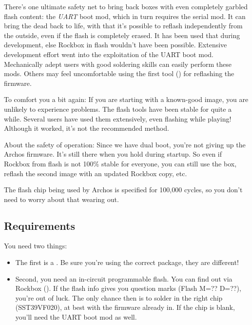
There's one ultimate safety net to bring back boxes with even completely 
garbled flash content: the \emph{UART} boot mod, which in turn requires the 
serial mod. It can bring the dead back to life, with that it's possible to 
reflash independently from the outside, even if the flash is completely erased.
It has been used that during development, else Rockbox in flash wouldn't have 
been possible. Extensive development effort went into the exploitation of the 
UART boot mod. Mechanically adept users with good soldering skills can easily 
perform these mods. Others may feel uncomfortable using the first tool 
() for reflashing the firmware.


To comfort you a bit again: If you are starting with a known-good image, you 
are unlikely to experience problems. The flash tools have been stable for quite
a while. Several users have used them extensively, even flashing while playing!
Although it worked, it's not the recommended method.

About the safety of operation: Since we have dual boot, you're not giving up 
the Archos firmware. It's still there when you hold
 during startup. So even if Rockbox from flash is not 100\% stable for
everyone, you can still use the box, reflash the second image with an updated 
Rockbox copy, etc.

The flash chip being used by Archos is specified for 100,000 cycles, so you don't need to worry about that wearing out.

\subsection{Requirements}
You need two things:
\begin{itemize}
\item The first is a \playername. Be sure you're using the correct package, 
  they are different!
\item Second, you need an in-circuit programmable flash.  You can find out via Rockbox (). If the flash info gives you question marks (Flash M=?? D=??), 
  you're out of luck. The only chance then is to solder in the right chip 
  (SST39VF020), at best with the firmware already in. If the chip is blank, 
  you'll need the UART boot mod as well.
\end{itemize}

